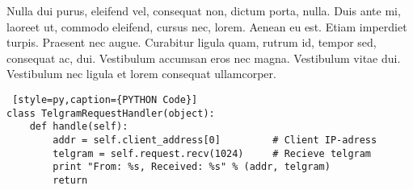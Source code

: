 Nulla dui purus, eleifend vel, consequat non, dictum porta, nulla. Duis ante mi, laoreet ut, commodo eleifend, cursus nec, lorem. Aenean eu est. Etiam imperdiet turpis. Praesent nec augue. Curabitur ligula quam, rutrum id, tempor sed, consequat ac, dui. Vestibulum accumsan eros nec magna. Vestibulum vitae dui. Vestibulum nec ligula et lorem consequat ullamcorper.

\begin{lstlisting} [style=py,caption={PYTHON Code}]
class TelgramRequestHandler(object):
    def handle(self):
        addr = self.client_address[0]         # Client IP-adress
        telgram = self.request.recv(1024)     # Recieve telgram
        print "From: %s, Received: %s" % (addr, telgram)
        return
\end{lstlisting}